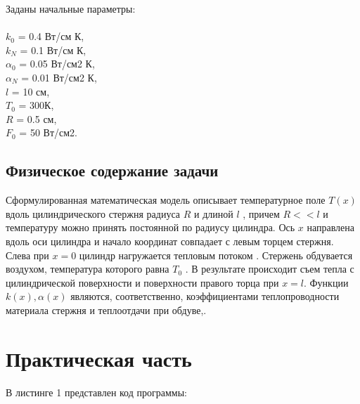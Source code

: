 \documentclass[a4paper, 14pt]{article}
\begin{document}
Заданы начальные параметры:\\ \\
$k_0$ = 0.4 Вт/см К,\\
$k_N$ = 0.1 Вт/см К,\\
$\alpha_0$ =  0.05 Вт/см2 К,\\
$\alpha_N$ = 0.01 Вт/см2 К,\\
$l$ =  10 см,\\
$T_0$ =  300К,\\
$R$ =  0.5 см,\\
$F_0$ =  50 Вт/см2.


\subsection*{Физическое содержание задачи}

Сформулированная математическая модель описывает температурное поле $T(x)$ вдоль  цилиндрического стержня радиуса $R$ и длиной  $l$ , причем $R<<l$  и температуру можно принять постоянной по радиусу цилиндра. Ось $x$ направлена вдоль оси цилиндра и начало координат совпадает с левым торцем стержня. Слева при $x=0$ цилиндр нагружается тепловым потоком  . Стержень обдувается воздухом, температура которого равна $T_0$ . В результате происходит съем тепла с цилиндрической поверхности и поверхности правого торца при  $x=l$. Функции $k(x), \alpha(x)$ являются, соответственно, коэффициентами теплопроводности материала стержня и теплоотдачи при обдуве,.

\section{Практическая часть}

В листинге 1 представлен код программы:
\end{document}
